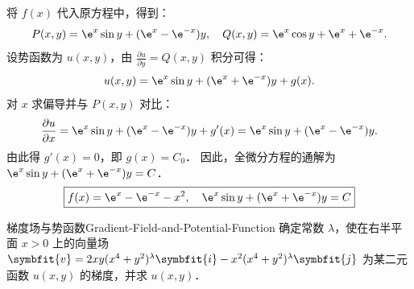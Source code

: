 \begin{solution}
    将 $f(x)$ 代入原方程中，得到：
    \begin{equation}
        P(x,y) = \e^x \sin y + (\e^x - \e^{-x})y, \quad Q(x,y) = \e^x \cos y + \e^x + \e^{-x}.
    \end{equation}
    设势函数为 $u(x,y)$，由 $\frac{\partial u}{\partial y} = Q(x,y)$ 积分可得：
    \begin{equation}
        u(x,y) = \e^x \sin y + (\e^x + \e^{-x})y + g(x).
    \end{equation}
    对 $x$ 求偏导并与 $P(x,y)$ 对比：
    \begin{equation}
        \frac{\partial u}{\partial x} = \e^x \sin y + (\e^x - \e^{-x})y + g'(x) = \e^x \sin y + (\e^x - \e^{-x})y.
    \end{equation}
    由此得 $g'(x) = 0$，即 $g(x) = C_0$．
    因此，全微分方程的通解为 $\e^x \sin y + (\e^x + \e^{-x})y = C$．
    \begin{equation}
        \boxed{f(x) = \e^x - \e^{-x} - x^2, \quad \e^x \sin y + (\e^x + \e^{-x})y = C}
    \end{equation}
\end{solution}

\begin{problem}{梯度场与势函数}{Gradient-Field-and-Potential-Function}
    确定常数 $\lambda$，使在右半平面 $x > 0$ 上的向量场 $\symbfit{v} = 2xy(x^4 + y^2)^\lambda \symbfit{i} - x^2(x^4 + y^2)^\lambda \symbfit{j}$ 为某二元函数 $u(x,y)$ 的梯度，并求 $u(x,y)$．
\end{problem}

